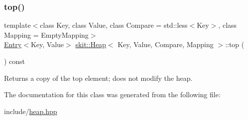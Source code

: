 \mbox{\label{classskit_1_1Heap_a2bab9895048623764dff0831ad68aed0}} 
\subsubsection{\texorpdfstring{top()}{top()}}
{\footnotesize\ttfamily template$<$class Key, class Value, class Compare = std\+::less$<$\+Key$>$, class Mapping = Empty\+Mapping$>$ \\
\hyperlink{structskit_1_1Entry}{Entry}$<$Key, Value$>$ \hyperlink{classskit_1_1Heap}{skit\+::\+Heap}$<$ Key, Value, Compare, Mapping $>$\+::top (\begin{DoxyParamCaption}{ }\end{DoxyParamCaption}) const\hspace{0.3cm}{\ttfamily [inline]}}



Returns a copy of the top element; does not modify the heap. 



The documentation for this class was generated from the following file\+:\begin{DoxyCompactItemize}
\item 
include/\hyperlink{heap_8hpp}{heap.\+hpp}\end{DoxyCompactItemize}

